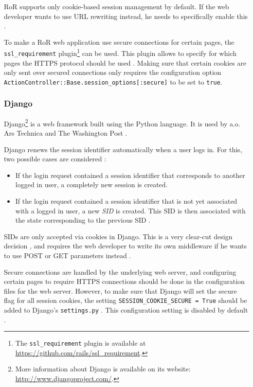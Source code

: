 RoR supports only cookie-based session management by default. If the web developer wants to use URL rewriting instead, he needs to specifically enable this \cite{McMahon2010}.

To make a RoR web application use secure connections for certain pages, the \texttt{ssl\_requirement} plugin\footnote{The \texttt{ssl\_requirement} plugin is available at \url{https://github.com/rails/ssl_requirement}.} can be used. This plugin allows to specify for which pages the HTTPS protocol should be used \cite{Slater2008}. Making sure that certain cookies are only sent over secured connections only requires the configuration option \texttt{ActionController::Base.session\_options[:secure]} to be set to \texttt{true}.

\subsubsection{Django}

Django\footnote{More information about Django is available on its website: \url{http://www.djangoproject.com/}.} is a web framework built using the Python language. It is used by a.o. Ars Technica and The Washington Post \cite{DjangoPoweredBy}.

Django renews the session identifier automatically when a user logs in. For this, two possible cases are considered \cite{DjangoLoginCode}:
\begin{itemize}
	\item If the login request contained a session identifier that corresponds to another logged in user, a completely new session is created.
	\item If the login request contained a session identifier that is not yet associated with a logged in user, a new \emph{SID} is created. This SID is then associated with the state corresponding to the previous SID \cite{DjangoSessionsCode}.
\end{itemize}

SIDs are only accepted via cookies in Django. This is a very clear-cut design decision \cite{DjangoSessions}, and requires the web developer to write its own middleware if he wants to use POST or GET parameters instead \cite{Fairs2007}.

Secure connections are handled by the underlying web server, and configuring certain pages to require HTTPS connections should be done in the configuration files for the web server. However, to make sure that Django will set the secure flag for all session cookies, the setting \texttt{SESSION\_COOKIE\_SECURE = True} should be added to Django's \texttt{settings.py} \cite{Barnham2009}. This configuration setting is disabled by default \cite{Holovaty2008}.

